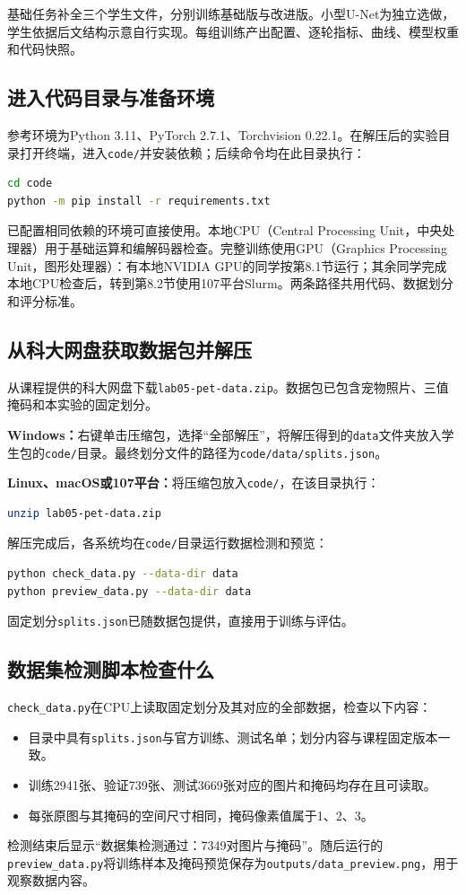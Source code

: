 \documentclass[UTF8,a4paper,11pt,fontset=fandol]{ctexart}
\newcommand{\file}[1]{\nolinkurl{#1}}
\begin{document}
基础任务补全三个学生文件，分别训练基础版与改进版。小型U-Net为独立选做，学生依据后文结构示意自行实现。每组训练产出配置、逐轮指标、曲线、模型权重和代码快照。

\subsection{进入代码目录与准备环境}
参考环境为Python 3.11、PyTorch 2.7.1、Torchvision 0.22.1。在解压后的实验目录打开终端，进入\file{code/}并安装依赖；后续命令均在此目录执行：
\begin{lstlisting}[language=bash]
cd code
python -m pip install -r requirements.txt
\end{lstlisting}
已配置相同依赖的环境可直接使用。本地CPU（Central Processing Unit，中央处理器）用于基础运算和编解码器检查。完整训练使用GPU（Graphics Processing Unit，图形处理器）：有本地NVIDIA GPU的同学按第8.1节运行；其余同学完成本地CPU检查后，转到第8.2节使用107平台Slurm。两条路径共用代码、数据划分和评分标准。
\clearpage

\subsection{从科大网盘获取数据包并解压}
从课程提供的科大网盘下载\file{lab05-pet-data.zip}。数据包已包含宠物照片、三值掩码和本实验的固定划分。

\textbf{Windows：}右键单击压缩包，选择“全部解压”，将解压得到的\file{data}文件夹放入学生包的\file{code/}目录。最终划分文件的路径为\file{code/data/splits.json}。

\textbf{Linux、macOS或107平台：}将压缩包放入\file{code/}，在该目录执行：
\begin{lstlisting}[language=bash]
unzip lab05-pet-data.zip
\end{lstlisting}
解压完成后，各系统均在\file{code/}目录运行数据检测和预览：
\begin{lstlisting}[language=bash]
python check_data.py --data-dir data
python preview_data.py --data-dir data
\end{lstlisting}
固定划分\file{splits.json}已随数据包提供，直接用于训练与评估。

\subsection{数据集检测脚本检查什么}
\file{check_data.py}在CPU上读取固定划分及其对应的全部数据，检查以下内容：
\begin{itemize}
\item 目录中具有\file{splits.json}与官方训练、测试名单；划分内容与课程固定版本一致。
\item 训练2941张、验证739张、测试3669张对应的图片和掩码均存在且可读取。
\item 每张原图与其掩码的空间尺寸相同，掩码像素值属于1、2、3。
\end{itemize}
检测结束后显示“数据集检测通过：7349对图片与掩码”。随后运行的\file{preview_data.py}将训练样本及掩码预览保存为\file{outputs/data_preview.png}，用于观察数据内容。
\end{document}
